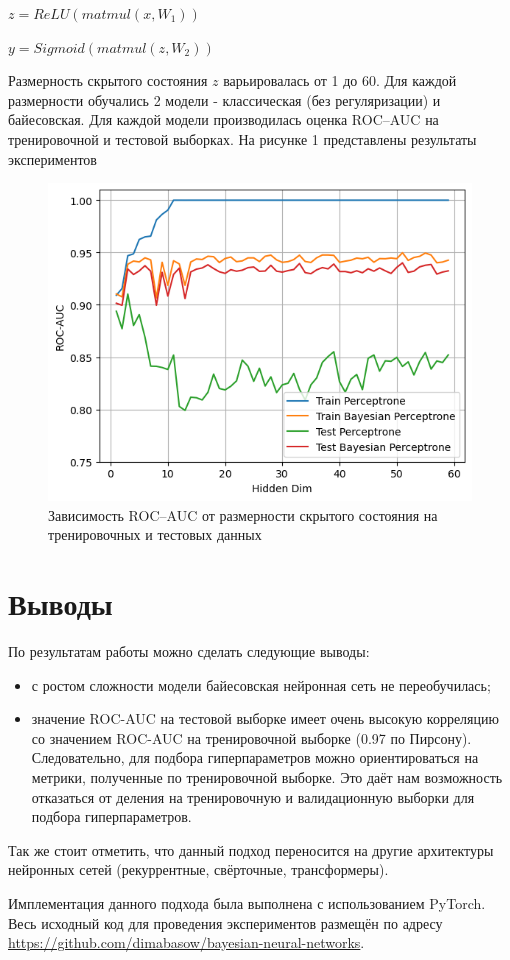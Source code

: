 \documentclass{article}
\begin{document}
    $z = ReLU(matmul(x, W_1))$

    $y = Sigmoid(matmul(z, W_2))$

    Размерность скрытого состояния $z$ варьировалась от 1 до 60. Для каждой размерности обучались 2 модели - классическая (без регуляризации) и байесовская. Для каждой модели производилась оценка ROC--AUC на тренировочной и тестовой выборках. На рисунке 1 представлены результаты экспериментов

    \begin{figure}
        \centering
        \includegraphics[width=1\linewidth]{roc_auc.png}
        \caption{Зависимость ROC--AUC от размерности скрытого состояния на тренировочных и тестовых данных}
        \label{fig:enter-label}
    \end{figure}

    \section{Выводы}
    По результатам работы можно сделать следующие выводы:
    \begin{itemize}
        \item с ростом сложности модели байесовская нейронная сеть не переобучилась;
        \item значение ROC-AUC на тестовой выборке имеет очень высокую корреляцию со значением ROC-AUC на тренировочной выборке (0.97 по Пирсону). Следовательно, для подбора гиперпараметров можно ориентироваться на метрики, полученные по тренировочной выборке. Это даёт нам возможность отказаться от деления на тренировочную и валидационную выборки для подбора гиперпараметров.
    \end{itemize}

    Так же стоит отметить, что данный подход переносится на другие архитектуры нейронных сетей (рекуррентные, свёрточные, трансформеры).

    Имплементация данного подхода была выполнена с использованием PyTorch. Весь исходный код для проведения экспериментов размещён по адресу \url{https://github.com/dimabasow/bayesian-neural-networks}.
\end{document}
